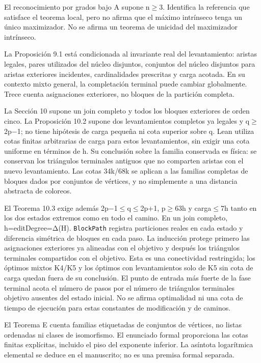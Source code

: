 \documentclass[spanish,11pt,a4paper]{article}
\begin{document}
El reconocimiento por grados bajo A supone n\ensuremath{\ge}3. Identifica la referencia
que satisface el teorema local, pero no afirma que el máximo intrínseco
tenga un único maximizador. No se afirma un teorema de unicidad del
maximizador intrínseco.

La Proposición 9.1 está condicionada al invariante real del
levantamiento: aristas legales, pares utilizados del núcleo disjuntos,
conjuntos del núcleo disjuntos para aristas exteriores incidentes,
cardinalidades prescritas y carga acotada. En su contexto mixto general,
la completación terminal puede cambiar globalmente. Trece cuenta
asignaciones exteriores, no bloques de la partición completa.

La Sección 10 supone un join completo y todos los bloques exteriores de
orden cinco. La Proposición 10.2 supone dos levantamientos completos ya
legales y q\ensuremath{\ge}2p−1; no tiene hipótesis de carga pequeña ni cota superior
sobre q. Lean utiliza cotas finitas arbitrarias de carga para estos
levantamientos, sin exigir una cota uniforme en términos de h. Su
conclusión sobre la familia conservada es física: se conservan los
triángulos terminales antiguos que no comparten aristas con el nuevo
levantamiento. Las cotas 34k/68k se aplican a las familias completas de
bloques dados por conjuntos de vértices, y no simplemente a una
distancia abstracta de coloreos.

El Teorema 10.3 exige además 2p−1\ensuremath{\le}q\ensuremath{\le}2p+1, p\ensuremath{\ge}63h y carga\ensuremath{\le}7h tanto en los
dos estados extremos como en todo el camino. En un join completo,
h=editDegree=Δ(H). \texttt{BlockPath} registra particiones reales en
cada estado y diferencia simétrica de bloques en cada paso. La inducción
protege primero las asignaciones exteriores ya alineadas con el objetivo
y después los triángulos terminales compartidos con el objetivo. Esta es
una conectividad restringida; los óptimos mixtos K4/K5 y los óptimos con
levantamientos solo de K5 sin cota de carga quedan fuera de su
conclusión. El punto de entrada más fuerte de la fase terminal acota el
número de pasos por el número de triángulos terminales objetivo ausentes
del estado inicial. No se afirma optimalidad ni una cota de tiempo de
ejecución para estas constantes de modificación y de caminos.

El Teorema E cuenta familias etiquetadas de conjuntos de vértices, no
listas ordenadas ni clases de isomorfismo. El enunciado formal
proporciona las cotas finitas explícitas, incluido el piso del exponente
inferior. La asíntota logarítmica elemental se deduce en el manuscrito;
no es una premisa formal separada.
\end{document}
